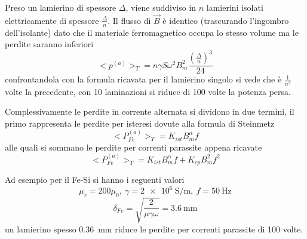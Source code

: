 Preso un lamierino di spessore $\Delta$, viene suddiviso in $n$ lamierini isolati elettricamente di 
spessore $\frac{\Delta}{n}$. Il flusso di $\vec{B}$ è identico (trascurando l'ingombro dell'isolante) dato che il
materiale ferromagnetico occupa lo stesso volume ma le perdite saranno inferiori
$$
<p^{(a)}>_T = n\gamma S\omega^2B_m^2\frac{\left(\frac{\Delta}{n}\right)^3}{24}
$$
confrontandola con la formula ricavata per il lamierino singolo si vede che è $\frac{1}{n^2}$ volte la precedente,
con 10 laminazioni si riduce di 100 volte la potenza persa.

Complessivamente le perdite in corrente alternata si dividono in due termini,
il primo rappresenta le perdite per isteresi dovute alla formula di Steinmetz
$$
<P_{Fe}^{(a)}>_T = K_{ist}B_m^\alpha f 
$$
alle quali si sommano le perdite per correnti parassite appena ricavate
$$
<P_{Fe}^{(a)}>_T = K_{ist}B_m^\alpha f  + K_{cp}B_m^2f^2
$$

Ad esempio per il Fe-Si si hanno i seguenti valori
$$
\mu_r = 200\mu_0,\ \gamma = \SI{2e6}{\siemens\per\meter},\ f = \SI{50}{\hertz}
$$
$$
\delta_{Fe} = \sqrt{\frac{2}{\mu\gamma\omega}} = \SI{3.6}{\milli\meter}
$$
un lamierino spesso \SI{0.36}{\milli\meter} riduce le perdite per correnti parassite di 100 volte.
